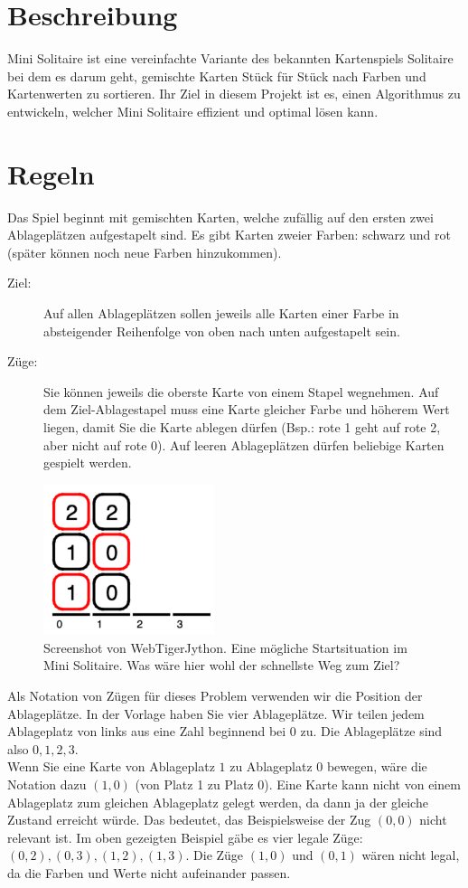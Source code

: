 \documentclass[a4paper,11pt,german,notitlepage]{report}
\begin{document}
\section*{Beschreibung}
Mini Solitaire ist eine vereinfachte Variante des bekannten Kartenspiels Solitaire bei dem es darum geht, gemischte Karten Stück für Stück nach Farben und Kartenwerten zu sortieren.
Ihr Ziel in diesem Projekt ist es, einen Algorithmus zu entwickeln, welcher Mini Solitaire effizient und optimal lösen kann.
\section*{Regeln}
Das Spiel beginnt mit gemischten Karten, welche zufällig auf den ersten zwei Ablageplätzen aufgestapelt sind.
Es gibt Karten zweier Farben: schwarz und rot (später können noch neue Farben hinzukommen).

\begin{description}
    \item[Ziel:] Auf allen Ablageplätzen sollen jeweils alle Karten einer Farbe in absteigender Reihenfolge von oben nach unten aufgestapelt sein.
    \item[Züge:] Sie können jeweils die oberste Karte von einem Stapel wegnehmen. Auf dem Ziel-Ablagestapel muss eine Karte gleicher Farbe und höherem Wert liegen, damit Sie die Karte ablegen dürfen (Bsp.: rote 1 geht auf rote 2, aber nicht auf rote 0). Auf leeren Ablageplätzen dürfen beliebige Karten gespielt werden.
\end{description}
\begin{figure}[h!]
    \centering
    \includegraphics[width=5cm]{mini_solitaire.png}
    \caption{Screenshot von WebTigerJython. Eine mögliche Startsituation im Mini Solitaire. Was wäre hier wohl der schnellste Weg zum Ziel?}
\end{figure}
Als Notation von Zügen für dieses Problem verwenden wir die Position der Ablageplätze.
In der Vorlage haben Sie vier Ablageplätze.
Wir teilen jedem Ablageplatz von links aus eine Zahl beginnend bei $0$ zu.
Die Ablageplätze sind also $0,1,2,3$.\\
Wenn Sie eine Karte von Ablageplatz $1$ zu Ablageplatz $0$ bewegen, wäre die Notation dazu $(1,0)$ (von Platz 1 zu Platz 0).
Eine Karte kann nicht von einem Ablageplatz zum gleichen Ablageplatz gelegt werden, da dann ja der gleiche Zustand erreicht würde.
Das bedeutet, das Beispielsweise der Zug $(0,0)$ nicht relevant ist.
Im oben gezeigten Beispiel gäbe es vier legale Züge: $(0,2),(0,3),(1,2),(1,3)$. Die Züge $(1,0)$ und $(0,1)$ wären nicht legal, da die Farben und Werte nicht aufeinander passen.
\end{document}
